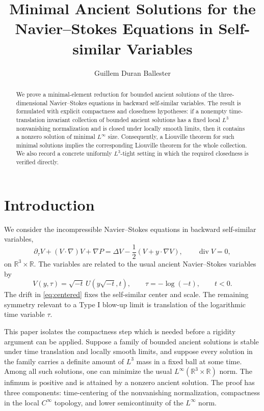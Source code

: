 \documentclass[11pt]{amsart}
\title[Minimal ancient solutions]{Minimal Ancient Solutions for the Navier--Stokes Equations in Self-similar Variables}
\author{Guillem Duran Ballester}
\date{}
\theoremstyle{plain}
\theoremstyle{definition}
\theoremstyle{remark}
\numberwithin{equation}{section}
\begin{document}
\begin{abstract}
We prove a minimal-element reduction for bounded ancient solutions of the
three-dimensional Navier--Stokes equations in backward self-similar variables.
The result is formulated with explicit compactness and closedness hypotheses:
if a nonempty time-translation invariant collection of bounded ancient
solutions has a fixed local \(L^3\) nonvanishing normalization and is closed
under locally smooth limits, then it contains a nonzero solution of minimal
\(L^\infty\) size.  Consequently, a Liouville theorem for such minimal
solutions implies the corresponding Liouville theorem for the whole collection.
We also record a concrete uniformly \(L^3\)-tight setting in which the required
closedness is verified directly.
\end{abstract}

\maketitle

\section{Introduction}

We consider the incompressible Navier--Stokes equations in backward
self-similar variables,
\begin{equation}\label{eq:centered}
   \partial_\tau V+(V\cdot\nabla)V+\nabla P
   =
   \Delta V-\frac12(V+y\cdot\nabla V),
   \qquad \operatorname{div}V=0,
\end{equation}
on \(\mathbb R^3\times\mathbb R\).  The variables are related to the usual
ancient Navier--Stokes variables by
\[
   V(y,\tau)=\sqrt{-t}\,U(y\sqrt{-t},t),\qquad \tau=-\log(-t),
   \qquad t<0.
\]
The drift in \eqref{eq:centered} fixes the self-similar center and scale.  The
remaining symmetry relevant to a Type I blow-up limit is translation of the
logarithmic time variable \(\tau\).

This paper isolates the compactness step which is needed before a rigidity
argument can be applied.  Suppose a family of bounded ancient solutions is
stable under time translation and locally smooth limits, and suppose every
solution in the family carries a definite amount of \(L^3\) mass in a fixed
ball at some time.  Among all such solutions, one can minimize the usual
\(L^\infty(\mathbb R^3\times\mathbb R)\) norm.  The infimum is positive and is
attained by a nonzero ancient solution.  The proof has three components:
time-centering of the nonvanishing normalization, compactness in the local
\(C^\infty\) topology, and lower semicontinuity of the \(L^\infty\) norm.
\end{document}

